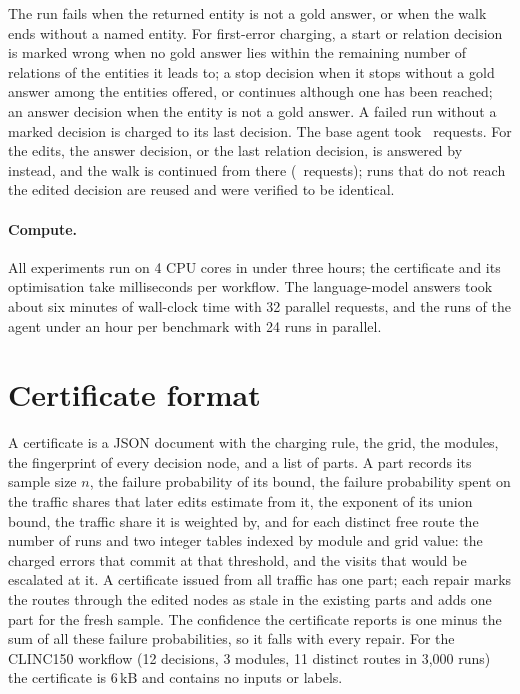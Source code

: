 The run fails when the returned entity is not a gold answer, or when the walk ends without a
named entity. For first-error charging, a start or relation decision is marked wrong when no
gold answer lies within the remaining number of relations of the entities it leads to; a stop
decision when it stops without a gold answer among the entities offered, or continues
although one has been reached; an answer decision when the entity is not a gold answer. A
failed run without a marked decision is charged to its last decision. The base agent took
\AgentRequestsBase\ requests. For the edits, the answer decision, or the last relation
decision, is answered by \texttt{\LlmUpgrade} instead, and the walk is continued from there
(\AgentRequestsUpgrade\ requests); runs that do not reach the edited decision are reused and
were verified to be identical.

\paragraph{Compute.} All experiments run on 4 CPU cores in under three hours; the certificate
and its optimisation take milliseconds per workflow. The language-model answers took about
six minutes of wall-clock time with 32 parallel requests, and the runs of the agent under an
hour per benchmark with 24 runs in parallel.

\section{Certificate format}\label{app:format}

A certificate is a JSON document with the charging rule, the grid, the modules, the
fingerprint of every decision node, and a list of parts. A part records its sample size $n$,
the failure probability of its bound, the failure probability spent on the traffic shares
that later edits estimate from it, the exponent of its union bound, the traffic share it is
weighted by, and for each distinct free route the number of runs and two integer tables
indexed by module and grid value: the charged errors that commit at that threshold, and the
visits that would be escalated at it. A certificate issued from all traffic has one part;
each repair marks the routes through the edited nodes as stale in the existing parts and adds
one part for the fresh sample. The confidence the certificate reports is one minus the sum
of all these failure probabilities, so it falls with every repair. For the CLINC150 workflow (12 decisions, 3 modules, 11
distinct routes in 3{,}000 runs) the certificate is 6\,kB and contains no inputs or labels.

